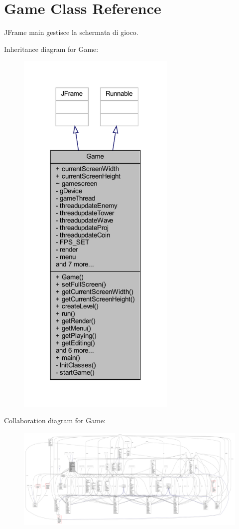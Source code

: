\hypertarget{classprogetto_1_1_game}{}\section{Game Class Reference}
\label{classprogetto_1_1_game}


J\+Frame main gestisce la schermata di gioco.  




Inheritance diagram for Game\+:\nopagebreak
\begin{figure}[H]
\begin{center}
\leavevmode
\includegraphics[width=215pt]{classprogetto_1_1_game__inherit__graph}
\end{center}
\end{figure}


Collaboration diagram for Game\+:
\nopagebreak
\begin{figure}[H]
\begin{center}
\leavevmode
\includegraphics[width=350pt]{classprogetto_1_1_game__coll__graph}
\end{center}
\end{figure}

